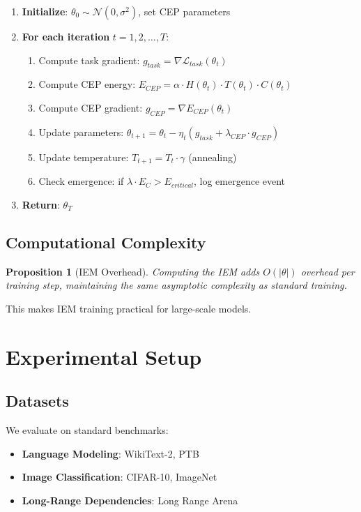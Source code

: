 \documentclass[12pt]{article}
\newtheorem{proposition}[theorem]{Proposition}
\begin{document}
\begin{enumerate}
\item \textbf{Initialize}: $\theta_0 \sim \mathcal{N}(0, \sigma^2)$, set CEP parameters
\item \textbf{For each iteration} $t = 1, 2, \ldots, T$:
   \begin{enumerate}
   \item Compute task gradient: $g_{task} = \nabla \mathcal{L}_{task}(\theta_t)$
   \item Compute CEP energy: $E_{CEP} = \alpha \cdot H(\theta_t) \cdot T(\theta_t) \cdot C(\theta_t)$
   \item Compute CEP gradient: $g_{CEP} = \nabla E_{CEP}(\theta_t)$
   \item Update parameters: $\theta_{t+1} = \theta_t - \eta_t(g_{task} + \lambda_{CEP} \cdot g_{CEP})$
   \item Update temperature: $T_{t+1} = T_t \cdot \gamma$ (annealing)
   \item Check emergence: if $\lambda \cdot E_C > E_{critical}$, log emergence event
   \end{enumerate}
\item \textbf{Return}: $\theta_T$
\end{enumerate}

\subsection{Computational Complexity}

\begin{proposition}[IEM Overhead]
Computing the IEM adds $O(|\theta|)$ overhead per training step, maintaining the same asymptotic complexity as standard training.
\end{proposition}

This makes IEM training practical for large-scale models.

\section{Experimental Setup}

\subsection{Datasets}

We evaluate on standard benchmarks:
\begin{itemize}
\item \textbf{Language Modeling}: WikiText-2, PTB
\item \textbf{Image Classification}: CIFAR-10, ImageNet
\item \textbf{Long-Range Dependencies}: Long Range Arena \cite{tay2021long}
\end{itemize}
\end{document}
